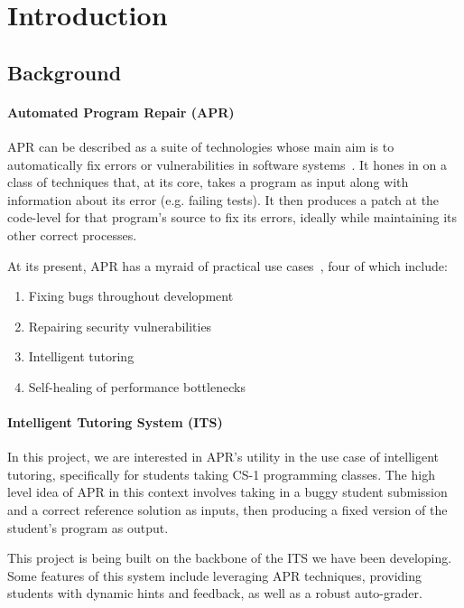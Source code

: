 \chapter{Introduction}
\label{introduction}

\section{Background}

\subsubsection{Automated Program Repair (APR)}

APR can be described as a suite of technologies whose main aim is to automatically
fix errors or vulnerabilities in software systems~\cite{le2021automatic}.
It hones in on a class of techniques that, at its core, takes a program as input
along with information about its error (e.g. failing tests).
It then produces a patch at the code-level for that program's source to fix its
errors, ideally while maintaining its other correct processes.

At its present, APR has a myraid of practical use cases~\cite{goues2019automated},
four of which include:

\begin{enumerate}
    \item Fixing bugs throughout development
    \item Repairing security vulnerabilities
    \item Intelligent tutoring
    \item Self-healing of performance bottlenecks
\end{enumerate}

\subsubsection{Intelligent Tutoring System (ITS)}

In this project, we are interested in APR's utility in the use case of intelligent tutoring,
specifically for students taking CS-1 programming classes.
The high level idea of APR in this context involves taking in a buggy student submission
and a correct reference solution as inputs, then producing a fixed version of the student's
program as output.

This project is being built on the backbone of the ITS we have been developing.
Some features of this system include leveraging APR techniques, providing students with
dynamic hints and feedback, as well as a robust auto-grader.


